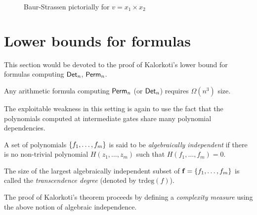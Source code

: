 \begin{figure}[h]
\begin{center}
\end{center}
\caption{Baur-Strassen pictorially for $v = x_1 \times x_2$}
\label{fig:baur-strassen}
\end{figure}


\section{Lower bounds for formulas}\label{sec:Kalorkoti}

This section would be devoted to the proof of Kalorkoti's lower bound \cite{k85} for formulas computing $\operatorname{\mathsf{Det}}_n$, $\operatorname{\mathsf{Perm}}_n$.

\begin{theorem}[\cite{k85}]\label{thm:kalorkoti}
  Any arithmetic formula computing $\operatorname{\mathsf{Perm}}_n$ (or $\operatorname{\mathsf{Det}}_n$) requires $\Omega(n^3)$ size.
\end{theorem}

The exploitable weakness in this setting is again to use the fact that the polynomials computed at intermediate gates share many polynomial dependencies.

\begin{definition}
  A set of polynomials $\left\{f_1,\dots, f_m\right\}$ is said to be \emph{algebraically independent} if there is no non-trivial polynomial $H(z_1,\dots, z_m)$ such that $H(f_1,\dots, f_m)=0$.

  The size of the largest algebraically independent subset of $\mathbf{f}=\left\{f_1,\dots, f_m\right\}$ is called the \emph{transcendence degree} (denoted by $\mathrm{trdeg}(f)$).
\end{definition}
The proof of Kalorkoti's theorem proceeds by defining a \emph{complexity measure} using the above notion of algebraic independence.
\\


